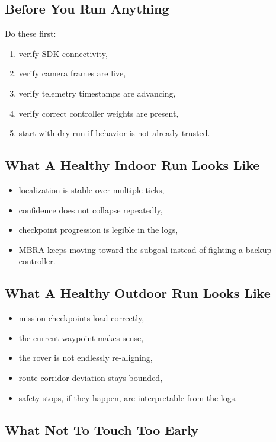 \documentclass[11pt]{article}
\begin{document}
\subsection{Before You Run Anything}

Do these first:

\begin{enumerate}[nosep]
  \item verify SDK connectivity,
  \item verify camera frames are live,
  \item verify telemetry timestamps are advancing,
  \item verify correct controller weights are present,
  \item start with dry-run if behavior is not already trusted.
\end{enumerate}

\subsection{What A Healthy Indoor Run Looks Like}

\begin{itemize}[nosep]
  \item localization is stable over multiple ticks,
  \item confidence does not collapse repeatedly,
  \item checkpoint progression is legible in the logs,
  \item MBRA keeps moving toward the subgoal instead of fighting a backup controller.
\end{itemize}

\subsection{What A Healthy Outdoor Run Looks Like}

\begin{itemize}[nosep]
  \item mission checkpoints load correctly,
  \item the current waypoint makes sense,
  \item the rover is not endlessly re-aligning,
  \item route corridor deviation stays bounded,
  \item safety stops, if they happen, are interpretable from the logs.
\end{itemize}

\subsection{What Not To Touch Too Early}
\end{document}
